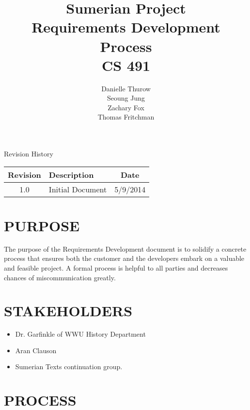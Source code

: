 \documentclass[11pt]{article}
\title{Sumerian Project\\
		Requirements Development Process\\
		CS 491}
\author{Danielle Thurow \\
		  Seoung Jung\\
		  Zachary Fox\\
		  Thomas Fritchman}
\date{}
\begin{document}
\maketitle
\newpage

\tableofcontents
\newpage

\begin{center}
\Large Revision History\\
\begin{tabularx}{\textwidth}{|c|X|c|}
    \hline
    \textbf{Revision} & \textbf{Description} & \textbf{Date}\\ \hline
    1.0 & Initial Document & 5/9/2014\\ \hline
\end{tabularx}
\end{center}
\newpage

\section{PURPOSE}
The purpose of the Requirements Development document is to solidify a concrete process that ensures both the customer and the developers embark on a valuable and feasible project. A formal process is helpful to all parties and decreases chances of miscommunication greatly.

\section{STAKEHOLDERS}
\begin{itemize}
    \item Dr. Garfinkle of WWU History Department
    \item Aran Clauson
    \item Sumerian Texts continuation group.
\end{itemize}

\section{PROCESS}
\end{document}
